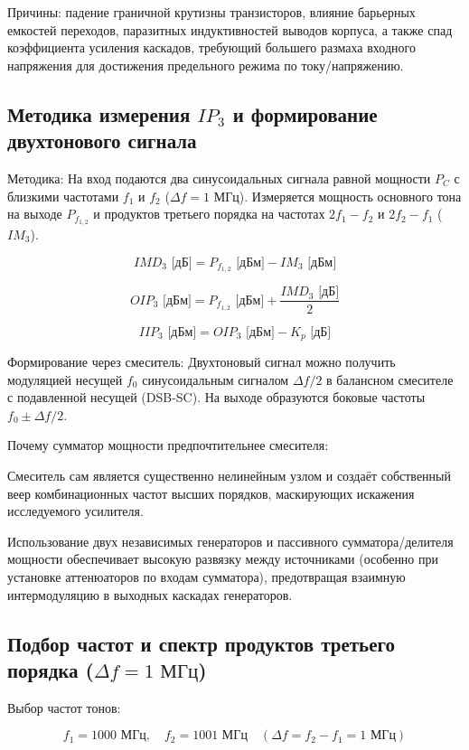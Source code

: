 Причины: падение граничной крутизны транзисторов, влияние барьерных емкостей переходов, паразитных индуктивностей выводов корпуса, а также спад коэффициента усиления каскадов, требующий большего размаха входного напряжения для достижения предельного режима по току/напряжению.

\subsection* {Методика измерения $IP_3$ и формирование двухтонового сигнала}

Методика: На вход подаются два синусоидальных сигнала равной мощности $P_C$ с близкими частотами $f_1$ и $f_2$ ($\Delta f = 1\text{ МГц}$). Измеряется мощность основного тона на выходе $P_{f_{1,2}}$ и продуктов третьего порядка на частотах $2f_1 - f_2$ и $2f_2 - f_1$ ($IM_3$).


$$IMD_3\text{ [дБ]} = P_{f_{1,2}}\text{ [дБм]} - IM_3\text{ [дБм]}$$

$$OIP_3\text{ [дБм]} = P_{f_{1,2}}\text{ [дБм]} + \frac{IMD_3\text{ [дБ]}}{2}$$

$$IIP_3\text{ [дБм]} = OIP_3\text{ [дБм]} - K_p\text{ [дБ]}$$

Формирование через смеситель: Двухтоновый сигнал можно получить модуляцией несущей $f_0$ синусоидальным сигналом $\Delta f / 2$ в балансном смесителе с подавленной несущей (DSB-SC). На выходе образуются боковые частоты $f_0 \pm \Delta f / 2$.

Почему сумматор мощности предпочтительнее смесителя:

Смеситель сам является существенно нелинейным узлом и создаёт собственный веер комбинационных частот высших порядков, маскирующих искажения исследуемого усилителя.

Использование двух независимых генераторов и пассивного сумматора/делителя мощности обеспечивает высокую развязку между источниками (особенно при установке аттенюаторов по входам сумматора), предотвращая взаимную интермодуляцию в выходных каскадах генераторов.

\subsection* {Подбор частот и спектр продуктов третьего порядка ($\Delta f = 1\text{ МГц}$)}

Выбор частот тонов:

$$f_1 = 1000\text{ МГц},\quad f_2 = 1001\text{ МГц}\quad (\Delta f = f_2 - f_1 = 1\text{ МГц})$$

